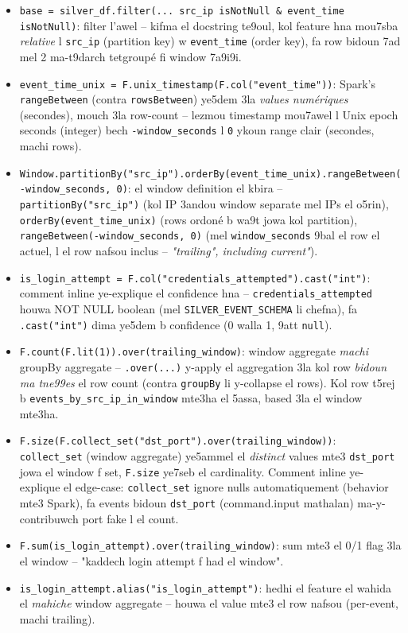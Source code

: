 \documentclass[11pt,a4paper]{report}
\DeclareRobustCommand{\code}[1]{\texttt{#1}}
\begin{document}
\begin{itemize}
  \item \code{base = silver\_df.filter(... src\_ip isNotNull \& event\_time
        isNotNull)}: filter l'awel -- kifma el docstring te9oul, kol
        feature hna mou7sba \emph{relative} l \code{src\_ip} (partition
        key) w \code{event\_time} (order key), fa row bidoun 7ad mel 2
        ma-t9darch tetgroupé fi window 7a9i9i.
  \item \code{event\_time\_unix = F.unix\_timestamp(F.col("event\_time"))}:
        Spark's \code{rangeBetween} (contra \code{rowsBetween}) ye5dem
        3la \emph{values numériques} (secondes), mouch 3la row-count --
        lezmou timestamp mou7awel l Unix epoch seconds (integer) bech
        \code{-window\_seconds} l \code{0} ykoun range clair (secondes,
        machi rows).
  \item \code{Window.partitionBy("src\_ip").orderBy(event\_time\_unix).rangeBetween(-window\_seconds, 0)}:
        el window definition el kbira -- \code{partitionBy("src\_ip")}
        (kol IP 3andou window separate mel IPs el o5rin), \code{orderBy(event\_time\_unix)}
        (rows ordoné b wa9t jowa kol partition), \code{rangeBetween(-window\_seconds, 0)}
        (mel \code{window\_seconds} 9bal el row el actuel, l el row nafsou
        inclus -- \emph{"trailing", including current"}).
  \item \code{is\_login\_attempt = F.col("credentials\_attempted").cast("int")}:
        comment inline ye-explique el confidence hna -- \code{credentials\_attempted}
        houwa NOT NULL boolean (mel \code{SILVER\_EVENT\_SCHEMA} li chefna),
        fa \code{.cast("int")} dima ye5dem b confidence (0 walla 1, 9att
        \code{null}).
  \item \code{F.count(F.lit(1)).over(trailing\_window)}: window aggregate
        \emph{machi} groupBy aggregate -- \code{.over(...)} y-apply el
        aggregation 3la kol row \emph{bidoun ma tne99es} el row count
        (contra \code{groupBy} li y-collapse el rows). Kol row t5rej
        b \code{events\_by\_src\_ip\_in\_window} mte3ha el 5assa, based
        3la el window mte3ha.
  \item \code{F.size(F.collect\_set("dst\_port").over(trailing\_window))}:
        \code{collect\_set} (window aggregate) ye5ammel el \emph{distinct}
        values mte3 \code{dst\_port} jowa el window f set, \code{F.size}
        ye7seb el cardinality. Comment inline ye-explique el edge-case:
        \code{collect\_set} ignore nulls automatiquement (behavior
        mte3 Spark), fa events bidoun \code{dst\_port} (command.input
        mathalan) ma-y-contribuwch port fake l el count.
  \item \code{F.sum(is\_login\_attempt).over(trailing\_window)}: sum mte3
        el 0/1 flag 3la el window -- "kaddech login attempt f had el
        window".
  \item \code{is\_login\_attempt.alias("is\_login\_attempt")}: hedhi
        el feature el wahida el \emph{mahiche} window aggregate -- houwa
        el value mte3 el row nafsou (per-event, machi trailing).
\end{itemize}
\end{document}
